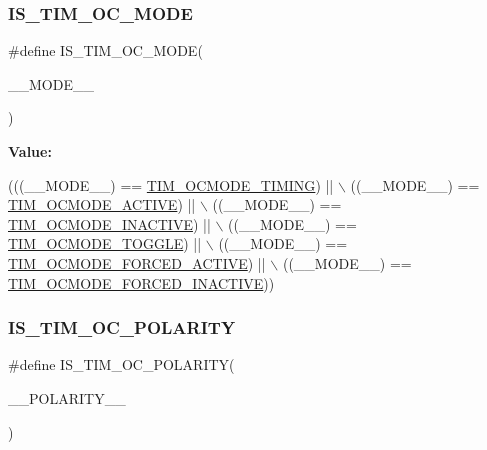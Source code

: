 \subsubsection{\texorpdfstring{I\+S\+\_\+\+T\+I\+M\+\_\+\+O\+C\+\_\+\+M\+O\+DE}{IS\_TIM\_OC\_MODE}}
{\footnotesize\ttfamily \#define I\+S\+\_\+\+T\+I\+M\+\_\+\+O\+C\+\_\+\+M\+O\+DE(\begin{DoxyParamCaption}\item[{}]{\+\_\+\+\_\+\+M\+O\+D\+E\+\_\+\+\_\+ }\end{DoxyParamCaption})}

{\bfseries Value\+:}
\begin{DoxyCode}
(((\_\_MODE\_\_) == \hyperlink{group___t_i_m___output___compare__and___p_w_m__modes_gafae6b98b4b854fbfffd9a5ebc59c8f61}{TIM\_OCMODE\_TIMING})             || \(\backslash\)
                                   ((\_\_MODE\_\_) == \hyperlink{group___t_i_m___output___compare__and___p_w_m__modes_ga111d1023e3ac6ef5544775c3863b4b12}{TIM\_OCMODE\_ACTIVE})             || \(\backslash\)
                                   ((\_\_MODE\_\_) == \hyperlink{group___t_i_m___output___compare__and___p_w_m__modes_ga890fbb44fd16f2bce962983352d23f53}{TIM\_OCMODE\_INACTIVE})           || \(\backslash\)
                                   ((\_\_MODE\_\_) == \hyperlink{group___t_i_m___output___compare__and___p_w_m__modes_ga368f80fad76018e2bf76084522e47536}{TIM\_OCMODE\_TOGGLE})             || \(\backslash\)
                                   ((\_\_MODE\_\_) == \hyperlink{group___t_i_m___output___compare__and___p_w_m__modes_ga0a78cecaf884a89963e2a8e6af7e6128}{TIM\_OCMODE\_FORCED\_ACTIVE})      ||
       \(\backslash\)
                                   ((\_\_MODE\_\_) == \hyperlink{group___t_i_m___output___compare__and___p_w_m__modes_ga4572f724ce30ce45557f1dc5141afb3e}{TIM\_OCMODE\_FORCED\_INACTIVE}))
\end{DoxyCode}
\mbox{\label{group___t_i_m___private___macros_gaff2871b7c01f0b706f90feb046995b95}} 
\subsubsection{\texorpdfstring{I\+S\+\_\+\+T\+I\+M\+\_\+\+O\+C\+\_\+\+P\+O\+L\+A\+R\+I\+TY}{IS\_TIM\_OC\_POLARITY}}
{\footnotesize\ttfamily \#define I\+S\+\_\+\+T\+I\+M\+\_\+\+O\+C\+\_\+\+P\+O\+L\+A\+R\+I\+TY(\begin{DoxyParamCaption}\item[{}]{\+\_\+\+\_\+\+P\+O\+L\+A\+R\+I\+T\+Y\+\_\+\+\_\+ }\end{DoxyParamCaption})}

